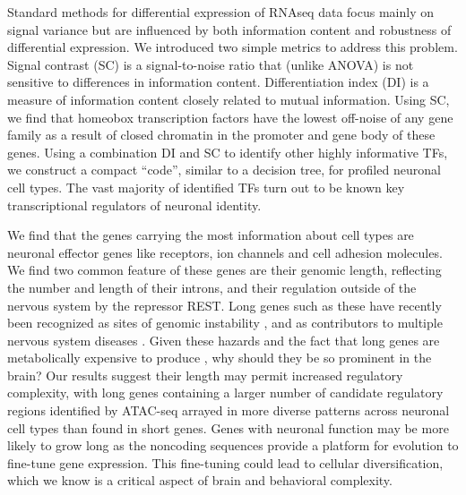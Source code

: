 
Standard methods for differential expression of RNAseq data focus mainly on signal variance but are influenced by both information content and robustness of differential expression. We introduced two simple metrics to address this problem. Signal contrast (SC) is a signal-to-noise ratio that (unlike ANOVA) is not sensitive to differences in information content. Differentiation index (DI) is a measure of information content closely related to mutual information. Using SC, we find that homeobox transcription factors have the lowest off-noise of any gene family as a result of closed chromatin in the promoter and gene body of these genes. Using a combination DI and SC to identify other highly informative TFs, we construct a compact “code”, similar to a decision tree, for profiled neuronal cell types. The vast majority of identified TFs turn out to be known key transcriptional regulators of neuronal identity.

We find that the genes carrying the most information about cell types are neuronal effector genes like receptors, ion channels and cell adhesion molecules. We find two common feature of these genes are their genomic length, reflecting the number and length of their introns, and their regulation outside of the nervous system by the repressor REST. Long genes such as these have recently been recognized as sites of genomic instability \cite{Wei_2016}, and as contributors to multiple nervous system diseases \cite{Sugino_2014,Gabel_2015,Zylka_2015}. Given these hazards and the fact that long genes are metabolically expensive to produce \cite{Castillo_Davis_2002}, why should they be so prominent in the brain? Our results suggest their length may permit increased regulatory complexity, with long genes containing a larger number of candidate regulatory regions identified by ATAC-seq arrayed in more diverse patterns across neuronal cell types than found in short genes. Genes with neuronal function may be more likely to grow long as the noncoding sequences provide a platform for evolution to fine-tune gene expression. This fine-tuning could lead to cellular diversification, which we know is a critical aspect of brain and behavioral complexity.
